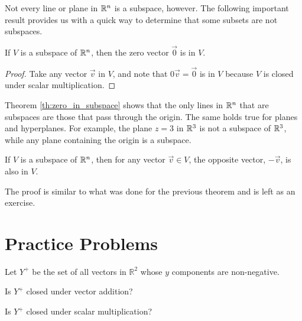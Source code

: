 \documentclass{ximera}
\begin{document}
Not every line or plane in $\mathbb{R}^n$ is a subspace, however.  The following important result provides us with a quick way to determine that some subsets are not subspaces.

\begin{theorem} \label{th:zero_in_subspace}
If $V$ is a subspace of $\mathbb{R}^n$, then the zero vector $\vec{0}$ is in $V$.
\end{theorem}

\begin{proof} 
Take any vector $\vec{v}$ in $V$, and note that $0 \vec{v} = \vec{0}$ is in $V$ because $V$ is closed under scalar multiplication.
\end{proof}

Theorem \ref{th:zero_in_subspace} shows that the only lines in $\mathbb{R}^n$ that are subspaces are those that pass through the origin.  The same holds true for planes and hyperplanes.  For example, the plane $z=3$ in $\mathbb{R}^3$ is not a subspace of $\mathbb{R}^3$, while any plane containing the origin is a subspace.

\begin{theorem} \label{th:opposite_in_subspace}
If $V$ is a subspace of $\mathbb{R}^n$, then for any vector $\vec{v} \in V$, the opposite vector, $-\vec{v}$, is also in $V$.
\end{theorem}

The proof is similar to what was done for the previous theorem and is left as an exercise.

\section*{Practice Problems}

\begin{problem}
Let $Y^+$ be the set of all vectors in $\mathbb{R}^2$ whose $y$ components are non-negative.    
 \begin{problem}\label{prob:Y^+1}
 Is $Y^+$ closed under vector addition?
 
 \begin{multipleChoice}
 \end{multipleChoice}
 
 \end{problem}
 
 \begin{problem}\label{prob:Y^+2}
 Is $Y^+$ closed under scalar multiplication?
 
  \begin{multipleChoice}
 \end{multipleChoice}
 
   \end{problem}
\end{problem}
\end{document}
